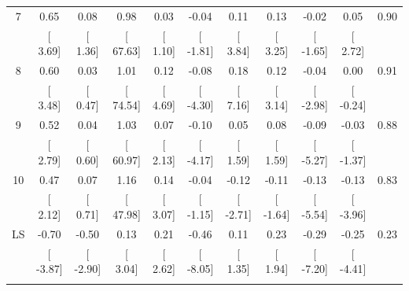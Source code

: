 \documentclass[12pt]{article}
\begin{document}
\begin{table}[!htbp]
\begin{tabular}{@{\extracolsep{0pt}} ccccccccccc}
7 & 0.65 & 0.08 & 0.98 & 0.03 & -0.04 & 0.11 & 0.13 & -0.02 & 0.05 & 0.90 \\ 
 & [ 3.69] & [ 1.36] & [ 67.63] & [ 1.10] & [ -1.81] & [ 3.84] & [ 3.25] & [ -1.65] & [ 2.72] &  \\ 
8 & 0.60 & 0.03 & 1.01 & 0.12 & -0.08 & 0.18 & 0.12 & -0.04 & 0.00 & 0.91 \\ 
 & [ 3.48] & [ 0.47] & [ 74.54] & [ 4.69] & [ -4.30] & [ 7.16] & [ 3.14] & [ -2.98] & [ -0.24] &  \\ 
9 & 0.52 & 0.04 & 1.03 & 0.07 & -0.10 & 0.05 & 0.08 & -0.09 & -0.03 & 0.88 \\ 
 & [ 2.79] & [ 0.60] & [ 60.97] & [ 2.13] & [ -4.17] & [ 1.59] & [ 1.59] & [ -5.27] & [ -1.37] &  \\ 
10 & 0.47 & 0.07 & 1.16 & 0.14 & -0.04 & -0.12 & -0.11 & -0.13 & -0.13 & 0.83 \\ 
 & [ 2.12] & [ 0.71] & [ 47.98] & [ 3.07] & [ -1.15] & [ -2.71] & [ -1.64] & [ -5.54] & [ -3.96] &  \\ 
LS & -0.70 & -0.50 & 0.13 & 0.21 & -0.46 & 0.11 & 0.23 & -0.29 & -0.25 & 0.23 \\ 
 & [ -3.87] & [ -2.90] & [ 3.04] & [ 2.62] & [ -8.05] & [ 1.35] & [ 1.94] & [ -7.20] & [ -4.41] &  \\ 
\hline \\[-1.8ex] 
\end{tabular} 
\end{table} 

\vspace{1cm}
\end{document}
